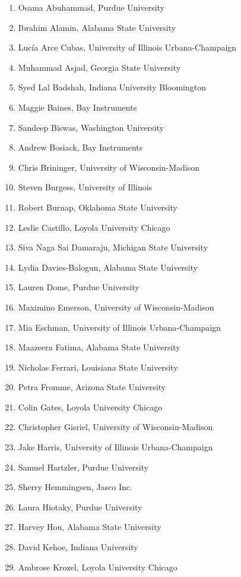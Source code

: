 \begin{multicols}{2}
	\begin{enumerate}
		\item Osama Abuhammad, Purdue University
\item Ibrahim	Alamin,	Alabama State University 
\item Lucía	Arce Cubas,	University of Illinois Urbana-Champaign
\item Muhammad	Asjad,	Georgia State University
\item Syed Lal 	Badshah,	Indiana University Bloomington
\item Maggie	Baines,	Bay Instruments
\item Sandeep 	Biswas,	Washington University
\item Andrew	Bosiack,	Bay Instruments
\item Chris	Brininger,	University of Wisconsin-Madison
\item Steven	Burgess,	University of Illinois
\item Robert Burnap, Oklahoma State University
\item Leslie	Castillo,	Loyola University Chicago
\item Siva Naga Sai	Damaraju,	Michigan State University
\item Lydia	Davies-Balogun,	Alabama State University
\item Lauren	Dome,	Purdue University
\item Maximino 	Emerson,	University of Wisconsin-Madison
\item Mia 	Eschman,	University of Illinois Urbana-Champaign
\item Maazeera	Fatima,	Alabama State University
\item Nicholas	Ferrari,	Louisiana State University
\item Petra	Fromme,	Arizona State University
\item Colin	Gates,	Loyola University Chicago
\item Christopher Gisriel, University of Wisconsin-Madison
\item Jake	Harris,	University of Illinois Urbana-Champaign
\item Samuel	Hartzler,	Purdue University
\item Sherry	Hemmingsen,	Jasco Inc.
\item Laura	Hiotaky,	Purdue University
\item Harvey 	Hou,	Alabama State University
\item David	Kehoe,	Indiana University
\item Ambrose	Krozel,	Loyola University Chicago

\end{enumerate}
\end{multicols}
